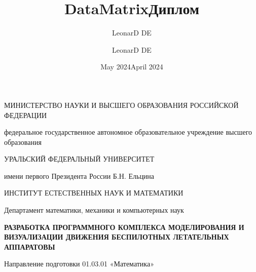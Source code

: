 \documentclass[a4paper,12pt]{article}
\title{DataMatrix}
\author{LeonarD DE}
\date{May 2024}
\title{Диплом}
\author{LeonarD DE}
\date{April 2024}
\begin{document}

\begin{titlepage}

\begin{center}
\MakeUppercase{министерство науки и высшего образования Российской Федерации} 

федеральное государственное автономное образовательное учреждение высшего образования

\MakeUppercase{уральский федеральный университет} 

имени первого Президента России Б.Н. Ельцина
\end{center}

\vspace{5mm}

\begin{center}    
  \MakeUppercase{институт естественных наук и математики} 
\end{center}

\vspace{20mm}

\begin{center}
  Департамент математики, механики и компьютерных наук
\end{center}

\vspace{10mm}

\begin{center}
    \bfseries \MakeUppercase{Разработка программного комплекса моделирования и визуализации движения беспилотных летательных аппаратовы}
\end{center}

\vspace{5mm}

\begin{center}
    Направление подготовки 01.03.01 «Математика»
\end{center}

\vspace{20mm}

\newlength\savedwidth

\newcommand\whline[1]{%
  \noalign{%
    \global\savedwidth\arrayrulewidth\global\arrayrulewidth 1.5pt%
  }%
  \cline{#1}%
  \noalign{\vskip\arrayrulewidth}%
  \noalign{\global\arrayrulewidth\savedwidth}%
}


\end{titlepage}
\end{document}
